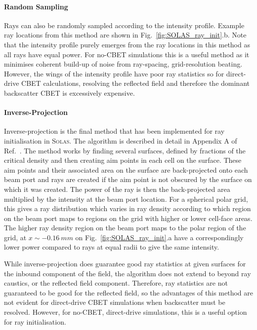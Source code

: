 \paragraph*{Random Sampling}
Rays can also be randomly sampled according to the intensity profile.
Example ray locations from this method are shown in Fig.~\ref{fig:SOLAS_ray_init}.b.
Note that the intensity profile purely emerges from the ray locations in this method as all rays have equal power.
For no-\ac{CBET} simulations this is a useful method as it minimises coherent build-up of noise from ray-spacing, grid-resolution beating.
However, the wings of the intensity profile have poor ray statistics so for direct-drive \ac{CBET} calculations, resolving the reflected field and therefore the dominant backscatter \ac{CBET} is excessively expensive.

\paragraph*{Inverse-Projection}
Inverse-projection is the final method that has been implemented for ray initialisation in \textsc{Solas}.
The algorithm is described in detail in Appendix A of Ref.~\cite{marozas_wavelength-detuning_2018}.
The method works by finding several surfaces, defined by fractions of the critical density and then creating aim points in each cell on the surface.
These aim points and their associated area on the surface are back-projected onto each beam port and rays are created if the aim point is not obscured by the surface on which it was created.
The power of the ray is then the back-projected area multiplied by the intensity at the beam port location.
For a spherical polar grid, this gives a ray distribution which varies in ray density according to which region on the beam port maps to regions on the grid with higher or lower cell-face areas.
The higher ray density region on the beam port maps to the polar region of the grid, at $x\sim -0.16\ mm$ on Fig.~\ref{fig:SOLAS_ray_init}.a have a correspondingly lower power compared to rays at equal radii to give the same intensity.

While inverse-projection does guarantee good ray statistics at given surfaces for the inbound component of the field, the algorithm does not extend to beyond ray caustics, or the reflected field component.
Therefore, ray statistics are not guaranteed to be good for the reflected field, so the advantages of this method are not evident for direct-drive \ac{CBET} simulations when backscatter must be resolved.
However, for no-\ac{CBET}, direct-drive simulations, this is a useful option for ray initialisation.

